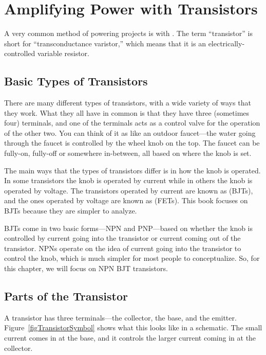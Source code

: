 \chapter{Amplifying Power with Transistors}

A very common method of powering projects is with .
The term ``transistor'' is short for ``transconductance varistor,'' which means that it is an electrically-controlled variable resistor.

\section{Basic Types of Transistors}

There are many different types of transistors, with a wide variety of ways that they work.
What they all have in common is that they have three (sometimes four) terminals, and one of the terminals acts as a control valve for the operation of the other two.
You can think of it as like an outdoor faucet---the water going through the faucet is controlled by the wheel knob on the top.
The faucet can be fully-on, fully-off or somewhere in-between, all based on where the knob is set.

The main ways that the types of transistors differ is in how the knob is operated.
In some transistors the knob is operated by current while in others the knob is operated by voltage.
The transistors operated by current are known as  (BJTs), and the ones operated by voltage are known as  (FETs).
This book focuses on BJTs because they are simpler to analyze.

BJTs come in two basic forms---NPN and PNP---based on whether the knob is controlled by current going into the transistor or current coming out of the transistor.
NPNs operate on the idea of current going into the transistor to control the knob, which is much simpler for most people to conceptualize.
So, for this chapter, we will focus on NPN BJT transistors.

\section{Parts of the Transistor}


A transistor has three terminals---the collector, the base, and the emitter.
Figure~\ref{figTransistorSymbol} shows what this looks like in a schematic.
The small current comes in at the base, and it controls the larger current coming in at the collector.

